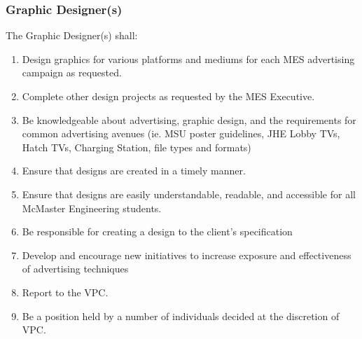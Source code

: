 
\subsubsection{Graphic Designer(s)}
\label{graphic-designers}
The Graphic Designer(s) shall:

\begin{enumerate}
 \item
  Design graphics for various platforms and mediums for each MES advertising campaign as requested.
 \item
  Complete other design projects as requested by the MES Executive.
 \item
  Be knowledgeable about advertising, graphic design, and the requirements for common advertising avenues (ie. MSU poster guidelines, JHE Lobby TVs, Hatch TVs, Charging Station, file types and formats)
 \item
  Ensure that designs are created in a timely manner.
 \item
  Ensure that designs are easily understandable, readable, and accessible for all McMaster Engineering students. 
 \item    
  Be responsible for creating a design to the client's specification
 \item
  Develop and encourage new initiatives to increase exposure and effectiveness of advertising techniques
 \item
  Report to the VPC.
 \item
  Be a position held by a number of individuals decided at the discretion of VPC.

\end{enumerate}